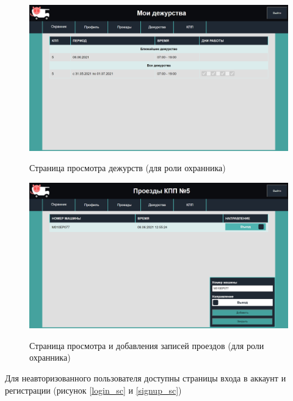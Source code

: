 \begin{figure}[h!] 
	\begin{center}
		{\includegraphics[scale=0.4, angle=0]{sc/guard_duty}}
		\caption{Страница просмотра дежурств (для роли охранника)}
		\label{guard_duty_sc}
	\end{center}
\end{figure}

\begin{figure}[h!] 
	\begin{center}
		{\includegraphics[scale=0.4, angle=0]{sc/pass_guard}}
		\caption{Страница просмотра и добавления записей проездов (для роли охранника)}
		\label{pass_guard_sc}
	\end{center}
\end{figure}

\newpage
Для неавторизованного пользователя доступны страницы входа в аккаунт и регистрации (рисунок \ref{login_sc} и \ref{signup_sc}) 

